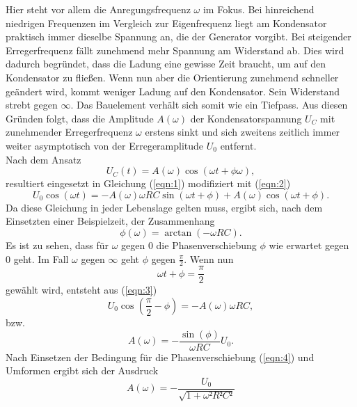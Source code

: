 Hier steht vor allem die Anregungsfrequenz $\omega$ im Fokus.
Bei hinreichend niedrigen Frequenzen im Vergleich zur Eigenfrequenz liegt am Kondensator praktisch immer dieselbe Spannung an, die der Generator vorgibt.
Bei steigender Erregerfrequenz fällt zunehmend mehr Spannung am Widerstand ab.
Dies wird dadurch begründet, dass die Ladung eine gewisse Zeit braucht, um auf den Kondensator zu fließen.
Wenn nun aber die Orientierung zunehmend schneller geändert wird, kommt weniger Ladung auf den Kondensator.
Sein Widerstand strebt gegen $\infty$.
Das Bauelement verhält sich somit wie ein Tiefpass.
Aus diesen Gründen folgt, dass die Amplitude $A(\omega)$ der Kondensatorspannung $U_C$ mit zunehmender Erregerfrequenz $\omega$ erstens sinkt und sich zweitens zeitlich immer weiter asymptotisch von der Erregeramplitude $U_0$ entfernt.\\
Nach dem Ansatz
\begin{equation}
  U_C(t) = A(\omega)\cos(\omega t+\phi{\omega}),
\end{equation}
resultiert eingesetzt in Gleichung (\ref{eqn:1}) modifiziert mit (\ref{eqn:2})
\begin{equation}
  U_0\cos(\omega t) = -A(\omega)\omega RC\sin(\omega t + \phi) + A(\omega)\cos(\omega t+\phi). \label{eqn:3}
\end{equation}
Da diese Gleichung in jeder Lebenslage gelten muss, ergibt sich, nach dem Einsetzten einer Beispielzeit, der Zusammenhang
\begin{equation}
  \phi(\omega) = \arctan(-\omega RC). \label{eqn:4}
\end{equation}
Es ist zu sehen, dass für $\omega$ gegen $0$ die Phasenverschiebung $\phi$ wie erwartet gegen $0$ geht.
Im Fall $\omega$ gegen $\infty$ geht $\phi$ gegen $\frac{\pi}{2}$.
Wenn nun
\begin{equation}
  \omega t + \phi = \frac{\pi}{2}
\end{equation}
gewählt wird, entsteht aus (\ref{eqn:3})
\begin{equation}
  U_0\cos(\frac{\pi}{2} - \phi) = -A(\omega)\omega RC,
\end{equation}
bzw.
\begin{equation}
  A(\omega) = -\frac{\sin(\phi)}{\omega RC}U_0.
\end{equation}
Nach Einsetzen der Bedingung für die Phasenverschiebung (\ref{eqn:4}) und Umformen ergibt sich der Ausdruck
\begin{equation}
  A(\omega) = -\frac{U_0}{\sqrt{1+\omega²R²C²}} \label{fuck1}
\end{equation}
